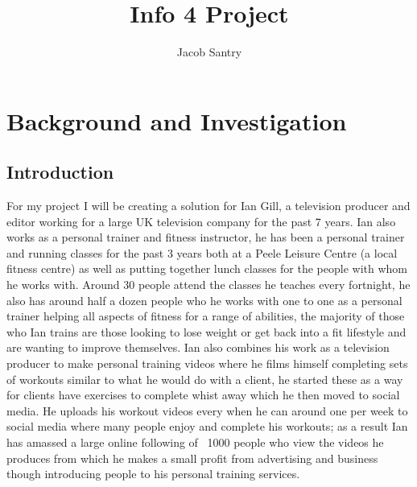 \documentclass[a4paper]{article}
\title{Info 4 Project}
\author{Jacob Santry}
\begin{document}
\thispagestyle{empty}
\maketitle

\tableofcontents

\section{Background and Investigation}

	\subsection{Introduction}
    For my project I will be creating a solution for Ian Gill, a television producer and editor working for a large UK television company for the past 7 years. Ian also works as a personal trainer and fitness instructor, he has been a personal trainer and running classes for the past 3 years both at a Peele Leisure Centre (a local fitness centre) as well as putting together lunch classes for the people with whom he works with. Around 30 people attend the classes he teaches every fortnight, he also has around half a dozen people who he works with one to one as a personal trainer helping all aspects of fitness for a range of abilities, the majority of those who Ian trains are those looking to lose weight or get back into a fit lifestyle and are wanting to improve themselves. Ian also combines his work as a television producer to make personal training videos where he films himself completing sets of workouts similar to what he would do with a client, he started these as a way for clients have exercises to complete whist away which he then moved to social media. He uploads his workout videos every when he can around one per week to social media where many people enjoy and complete his workouts; as a result Ian has amassed a large online following of ~1000 people who view the videos he produces from which he makes a small profit from advertising and business though introducing people to his personal training services.
\end{document}
